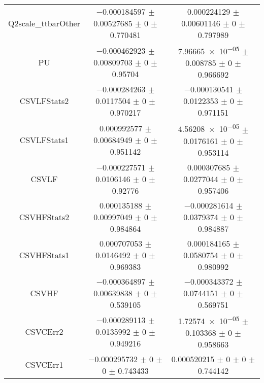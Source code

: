 \begin{table}
\begin{tabular}{ccc}
Q2scale\_ttbarOther & \num{-0.000184597} $\pm$ \num{0.00527685} $\pm$ \num{0} $\pm$ \num{0.770481} & \num{0.000224129} $\pm$ \num{0.00601146} $\pm$ \num{0} $\pm$ \num{0.797989}\\
PU & \num{-0.000462923} $\pm$ \num{0.00809703} $\pm$ \num{0} $\pm$ \num{0.95704} & \num{7.96665e-05} $\pm$ \num{0.008785} $\pm$ \num{0} $\pm$ \num{0.966692}\\
CSVLFStats2 & \num{-0.000284263} $\pm$ \num{0.0117504} $\pm$ \num{0} $\pm$ \num{0.970217} & \num{-0.000130541} $\pm$ \num{0.0122353} $\pm$ \num{0} $\pm$ \num{0.971151}\\
CSVLFStats1 & \num{0.000992577} $\pm$ \num{0.00684949} $\pm$ \num{0} $\pm$ \num{0.951142} & \num{4.56208e-05} $\pm$ \num{0.0176161} $\pm$ \num{0} $\pm$ \num{0.953114}\\
CSVLF & \num{-0.000227571} $\pm$ \num{0.0106146} $\pm$ \num{0} $\pm$ \num{0.92776} & \num{0.000307685} $\pm$ \num{0.0277044} $\pm$ \num{0} $\pm$ \num{0.957406}\\
CSVHFStats2 & \num{0.000135188} $\pm$ \num{0.00997049} $\pm$ \num{0} $\pm$ \num{0.984864} & \num{-0.000281614} $\pm$ \num{0.0379374} $\pm$ \num{0} $\pm$ \num{0.984887}\\
CSVHFStats1 & \num{0.000707053} $\pm$ \num{0.0146492} $\pm$ \num{0} $\pm$ \num{0.969383} & \num{0.000184165} $\pm$ \num{0.0580754} $\pm$ \num{0} $\pm$ \num{0.980992}\\
CSVHF & \num{-0.000364897} $\pm$ \num{0.00639838} $\pm$ \num{0} $\pm$ \num{0.539105} & \num{-0.000343372} $\pm$ \num{0.0744151} $\pm$ \num{0} $\pm$ \num{0.569751}\\
CSVCErr2 & \num{-0.000289113} $\pm$ \num{0.0135992} $\pm$ \num{0} $\pm$ \num{0.949216} & \num{1.72574e-05} $\pm$ \num{0.103368} $\pm$ \num{0} $\pm$ \num{0.958663}\\
CSVCErr1 & \num{-0.000295732} $\pm$ \num{0} $\pm$ \num{0} $\pm$ \num{0.743433} & \num{0.000520215} $\pm$ \num{0} $\pm$ \num{0} $\pm$ \num{0.744142}\\
\bottomrule
\end{tabular}
\end{table}